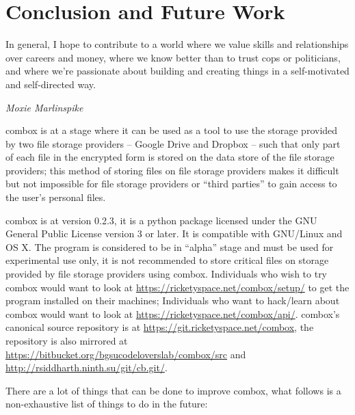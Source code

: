 \chapter{Conclusion and Future Work}\label{ch:5}

\epigraph{In general, I hope to contribute to a world where we value
  skills and relationships over careers and money, where we know
  better than to trust cops or politicians, and where we're passionate
  about building and creating things in a self-motivated and
  self-directed way.}{\textit{Moxie Marlinspike}}

combox is at a stage where it can be used as a tool to use the storage
provided by two file storage providers -- Google Drive and Dropbox --
such that only part of each file in the encrypted form is stored on
the data store of the file storage providers; this method of storing
files on file storage providers makes it difficult but not impossible
for file storage providers or ``third parties'' to gain access to the
user's personal files.

combox is at version 0.2.3, it is a python package licensed under the
GNU General Public License version 3 or later. It is compatible with
GNU/Linux and OS X. The program is considered to be in ``alpha'' stage
and must be used for experimental use only, it is not recommended to
store critical files on storage provided by file storage providers
using combox. Individuals who wish to try combox would want to look at
\url{https://ricketyspace.net/combox/setup/} to get the program
installed on their machines; Individuals who want to hack/learn about
combox would want to look at
\url{https://ricketyspace.net/combox/api/}. combox's canonical source
repository is at \url{https://git.ricketyspace.net/combox}, the
repository is also mirrored at
\url{https://bitbucket.org/bgsucodeloverslab/combox/src} and
\url{http://rsiddharth.ninth.su/git/cb.git/}.

There are a lot of things that can be done to improve combox, what
follows is a non-exhaustive list of things to do in the future:

